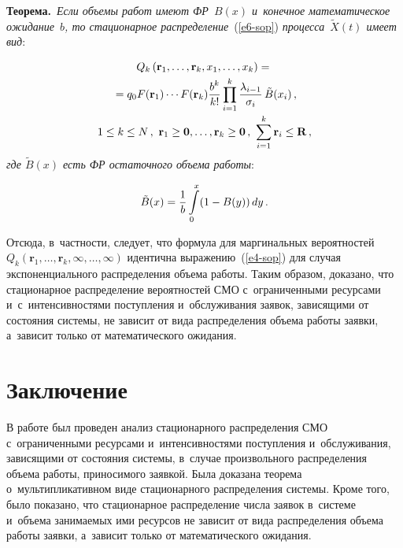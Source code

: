 \begin{multicols}{2}

\noindent
\textbf{Теорема.}\ \textit{Если объемы работ имеют ФР~$B(x)$ и~конечное 
математическое ожидание~$b$, то стационарное  
распределение}~(\ref{e6-sop}) \textit{процесса~$\tilde{X}(t)$ имеет вид}:

\vspace*{-6pt}

\noindent
\begin{multline*}
Q_k\left( \mathbf{r}_1,\ldots, \mathbf{r}_k, x_1,\ldots, x_k\right) ={}\\[-1pt]
{}=q_0 
F(\mathbf{r}_1)\cdots F(\mathbf{r}_k) \fr{b^k}{k!}\prod\limits^k_{i=1} 
\fr{\lambda_{i-1}}{\sigma_i} \,\tilde{B}(x_i)\,,\\[-1pt]
1\leq k\leq N\,, \ \mathbf{r}_1\geq \mathbf{0},\ldots , \mathbf{r}_k\geq \mathbf{0}\,,\ 
\sum\limits^k_{i=1} \mathbf{r}_i \leq \mathbf{R}\,,
\end{multline*}
\textit{где $\tilde{B}(x)$ есть ФР остаточного объема 
работы}:


\noindent
\begin{equation*}
\tilde{B}(x) =\displaystyle\frac{\displaystyle 1\mathstrut}{\displaystyle b\mathstrut}\int\limits_0^x (1-B(y))\,dy\,.
\end{equation*}

\noindent
    Отсюда, в~частности, следует, что формула для маргинальных 
вероятностей $Q_k(\mathbf{r}_1, \ldots, \mathbf{r}_k, \infty, \ldots, \infty)$ 
идентична выражению~(\ref{e4-sop}) для случая экспоненциального 
распределения объема работы. Таким образом, доказано, что стационарное 
распределение вероятностей СМО с~ограниченными ресурсами 
и~с~интенсивностями поступления и~обслуживания заявок, зависящими от 
состояния сис\-те\-мы, не зависит от вида распределения объема работы заявки, 
а~зависит только от математического ожидания.
  
  \section{Заключение}
  
  В работе был проведен анализ стационарного распределения СМО
   с~ограниченными ресурсами и~интенсивностями 
поступления и~обслуживания, зависящими от со\-сто\-яния сис\-те\-мы, в~случае 
произвольного распределения объема работы, приносимого заявкой. Была 
доказана теорема о~мультипликативном виде стационарного распределения 
системы. Кроме того, было показано, что стационарное распределение чис\-ла 
заявок в~системе и~объема занимаемых ими ресурсов не зависит от вида 
распределения объема работы заявки, а~зависит только от математического 
ожидания.
  

\end{multicols}
